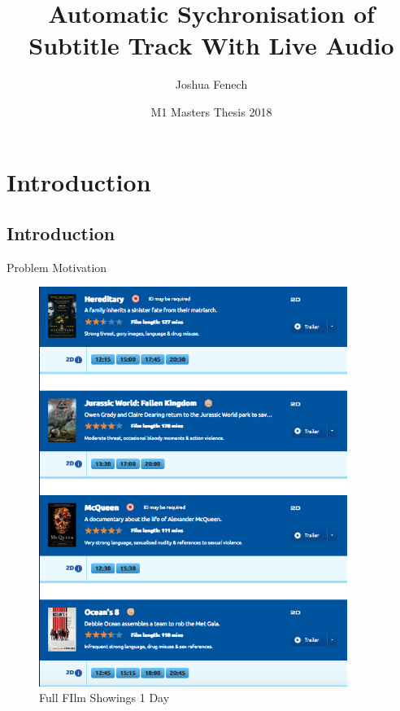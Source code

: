 \documentclass[notes]{beamer}
\title[Patterns for SoS Reconfiguration] 
{Automatic Sychronisation of Subtitle Track With Live Audio}
\author[Joshua Fenech] 
{Joshua Fenech}
\institute[]
{
	MLDM\\
	Universit\'e de Jean Monnet\\
	Saint-\'Etienne, France
}
\date[SESOS 2015] 
{M1 Masters Thesis 2018}
\begin{document}
\begin{frame}
  \titlepage
\end{frame}


\section{Introduction}

\subsection{Introduction}


\begin{frame}{Problem Motivation}
\begin{figure}
	\centering
	\begin{minipage}{0.45\textwidth}
		\centering
		\includegraphics[width=0.9\textwidth]{figures/ALLMOVIESLONDONFULL} %
		\caption{Full FIlm Showings 1 Day}
	\end{minipage}\hfill
	\begin{minipage}{0.45\textwidth}
		\centering
	\end{minipage}
\end{figure}
\end{frame}
\end{document}

